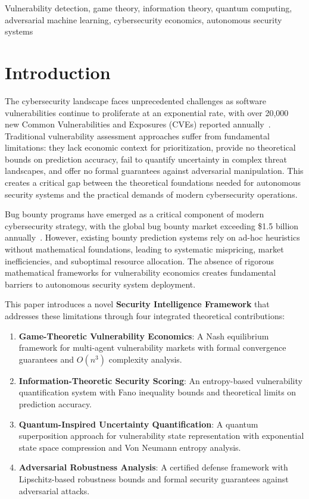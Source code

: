 \documentclass[journal]{IEEEtran}
\begin{document}
\begin{IEEEkeywords}
Vulnerability detection, game theory, information theory, quantum computing, adversarial machine learning, cybersecurity economics, autonomous security systems
\end{IEEEkeywords}

\section{Introduction}

The cybersecurity landscape faces unprecedented challenges as software vulnerabilities continue to proliferate at an exponential rate, with over 20,000 new Common Vulnerabilities and Exposures (CVEs) reported annually~\cite{mitre2024}. Traditional vulnerability assessment approaches suffer from fundamental limitations: they lack economic context for prioritization, provide no theoretical bounds on prediction accuracy, fail to quantify uncertainty in complex threat landscapes, and offer no formal guarantees against adversarial manipulation. This creates a critical gap between the theoretical foundations needed for autonomous security systems and the practical demands of modern cybersecurity operations.

Bug bounty programs have emerged as a critical component of modern cybersecurity strategy, with the global bug bounty market exceeding \$1.5 billion annually~\cite{hackerone2024}. However, existing bounty prediction systems rely on ad-hoc heuristics without mathematical foundations, leading to systematic mispricing, market inefficiencies, and suboptimal resource allocation. The absence of rigorous mathematical frameworks for vulnerability economics creates fundamental barriers to autonomous security system deployment.

This paper introduces a novel \textbf{Security Intelligence Framework} that addresses these limitations through four integrated theoretical contributions:

\begin{enumerate}
\item \textbf{Game-Theoretic Vulnerability Economics}: A Nash equilibrium framework for multi-agent vulnerability markets with formal convergence guarantees and $O(n^3)$ complexity analysis.

\item \textbf{Information-Theoretic Security Scoring}: An entropy-based vulnerability quantification system with Fano inequality bounds and theoretical limits on prediction accuracy.

\item \textbf{Quantum-Inspired Uncertainty Quantification}: A quantum superposition approach for vulnerability state representation with exponential state space compression and Von Neumann entropy analysis.

\item \textbf{Adversarial Robustness Analysis}: A certified defense framework with Lipschitz-based robustness bounds and formal security guarantees against adversarial attacks.
\end{enumerate}
\end{document}
